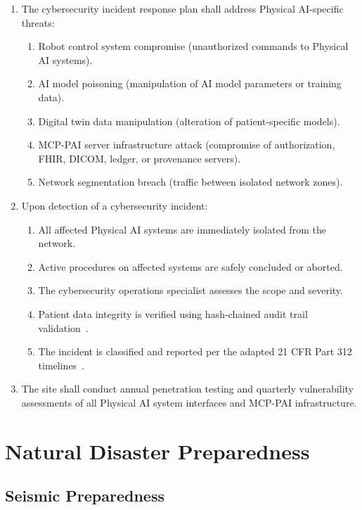 \begin{enumerate}[label=(\alph*)]
\item The cybersecurity incident response plan shall address Physical
  AI-specific threats:
  \begin{enumerate}[label=(\arabic*)]
  \item Robot control system compromise (unauthorized commands to Physical AI
    systems).
  \item AI model poisoning (manipulation of AI model parameters or training
    data).
  \item Digital twin data manipulation (alteration of patient-specific models).
  \item MCP-PAI server infrastructure attack (compromise of authorization,
    FHIR, DICOM, ledger, or provenance servers).
  \item Network segmentation breach (traffic between isolated network
    zones).
  \end{enumerate}

\item Upon detection of a cybersecurity incident:
  \begin{enumerate}[label=(\arabic*)]
  \item All affected Physical AI systems are immediately isolated from the
    network.
  \item Active procedures on affected systems are safely concluded or aborted.
  \item The cybersecurity operations specialist assesses the scope and
    severity.
  \item Patient data integrity is verified using hash-chained audit trail
    validation~\cite{iche6r3adapt}.
  \item The incident is classified and reported per the adapted 21 CFR
    Part 312 timelines~\cite{cfr312adapt}.
  \end{enumerate}

\item The site shall conduct annual penetration testing and quarterly
  vulnerability assessments of all Physical AI system interfaces and
  MCP-PAI infrastructure.
\end{enumerate}

\section{Natural Disaster Preparedness}

\subsection{Seismic Preparedness}

